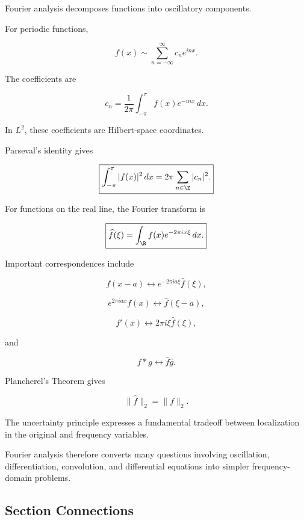 Fourier analysis decomposes functions into oscillatory components.

For periodic functions,

\[
\boxed{
f(x)
\sim
\sum_{n=-\infty}^{\infty}
c_ne^{inx}.
}
\]

The coefficients are

\[
\boxed{
c_n
=
\frac{1}{2\pi}
\int_{-\pi}^{\pi}
f(x)e^{-inx}\,dx.
}
\]

In \(L^2\), these coefficients are Hilbert-space coordinates.

Parseval's identity gives

\[
\boxed{
\int_{-\pi}^{\pi}|f(x)|^2\,dx
=
2\pi
\sum_{n\in\Z}|c_n|^2.
}
\]

For functions on the real line, the Fourier transform is

\[
\boxed{
\widehat{f}(\xi)
=
\int_{\R}
f(x)e^{-2\pi ix\xi}\,dx.
}
\]

Important correspondences include

\[
\boxed{
f(x-a)
\longleftrightarrow
e^{-2\pi ia\xi}\widehat{f}(\xi),
}
\]

\[
\boxed{
e^{2\pi iax}f(x)
\longleftrightarrow
\widehat{f}(\xi-a),
}
\]

\[
\boxed{
f'(x)
\longleftrightarrow
2\pi i\xi\widehat{f}(\xi),
}
\]

and

\[
\boxed{
f*g
\longleftrightarrow
\widehat{f}\widehat{g}.
}
\]

Plancherel's Theorem gives

\[
\boxed{
\|\widehat{f}\|_2
=
\|f\|_2.
}
\]

The uncertainty principle expresses a fundamental tradeoff between
localization in the original and frequency variables.

Fourier analysis therefore converts many questions involving oscillation,
differentiation, convolution, and differential equations into simpler
frequency-domain problems.

\subsection{Section Connections}
\label{subsec:fourier-analysis-connections}

